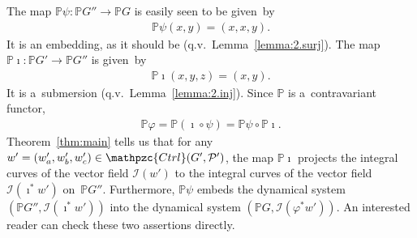 \documentclass[pdftex]{sigma}
\numberwithin{equation}{section}
\begin{document}
\begin{Example}
The map $\mathbb{P} \psi\colon \mathbb{P} G'' \to \mathbb{P} G$ is easily seen to be given~by
\begin{gather*}
\mathbb{P}\psi (x,y) = (x,x,y).
\end{gather*}
It is an embedding, as it should be (q.v.\ Lemma~\ref{lemma:2.surj}).
The map $\mathbb{P} \imath\colon \mathbb{P} G'\to \mathbb{P} G''$ is given~by
\begin{gather*}
\mathbb{P} \imath (x,y,z) = (x,y).
\end{gather*}
It is a~submersion (q.v.\ Lemma~\ref{lemma:2.inj}).
Since $\mathbb{P}$ is a~contravariant functor,
\begin{gather*}
\mathbb{P} \varphi = \mathbb{P} (\imath \circ \psi) = \mathbb{P}\psi \circ \mathbb{P} \imath.
\end{gather*}
Theorem~\ref{thm:main} tells us that for any $w' = (w_a', w_b', w_c') \in \mathpzc{Ctrl} (G', {\mathcal P}')$, the map
$\mathbb{P} \imath$ projects the integral curves of the vector f\/ield $\mathscr{I} (w')$ to the integral curves of the
vector f\/ield $\mathscr{I} (\imath^* w')$ on~$\mathbb{P} G''$.
Furthermore, $\mathbb{P} \psi$ embeds the dynamical system $(\mathbb{P} G'', \mathscr{I} (\imath^* w'))$ into the
dynamical system $(\mathbb{P} G, \mathscr{I} (\varphi^* w'))$.
An interested reader can check these two assertions directly.
\end{Example}
\end{document}
